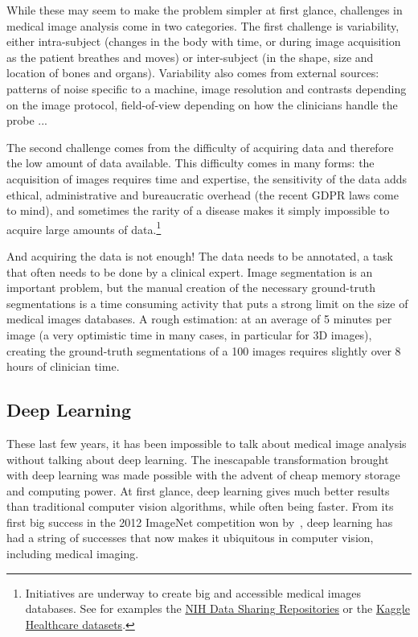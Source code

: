 While these may seem to make the problem simpler at first glance, challenges in medical image analysis come in two categories. The first challenge is variability, either intra-subject (changes in the body with time, or during image acquisition as the patient breathes and moves) or inter-subject (in the shape, size and location of bones and organs). Variability also comes from external sources: patterns of noise specific to a machine, image resolution and contrasts depending on the image protocol, field-of-view depending on how the clinicians handle the probe ... 

The second challenge comes from the difficulty of acquiring data and therefore the low amount of data available. This difficulty comes in many forms: the acquisition of images requires time and expertise, the sensitivity of the data adds ethical, administrative and bureaucratic overhead (the recent GDPR laws come to mind), and sometimes the rarity of a disease makes it simply impossible to acquire large amounts of data.\footnote{Initiatives are underway to create big and accessible medical images databases. See for examples the \href{https://www.nlm.nih.gov/NIHbmic/nih_data_sharing_repositories.html}{NIH Data Sharing Repositories} or the \href{https://www.kaggle.com/datasets?tagids=4202}{Kaggle Healthcare datasets}.} 

And acquiring the data is not enough! The data needs to be annotated, a task that often needs to be done by a clinical expert. Image segmentation is an important problem, but the manual creation of the necessary ground-truth segmentations is a time consuming activity that puts a strong limit on the size of medical images databases. A rough estimation: at an average of 5 minutes per image (a very optimistic time in many cases, in particular for 3D images), creating the ground-truth segmentations of a 100 images requires slightly over 8 hours of clinician time.

\subsection{Deep Learning}

These last few years, it has been impossible to talk about medical image analysis without talking about deep learning. The inescapable transformation brought with deep learning was made possible with the advent of cheap memory storage and computing power. At first glance, deep learning gives much better results than traditional computer vision algorithms, while often being faster. From its first big success in the 2012 ImageNet competition won by~\textcite{krizhevsky2012NIPS}, deep learning has had a string of successes that now makes it ubiquitous in computer vision, including medical imaging.

